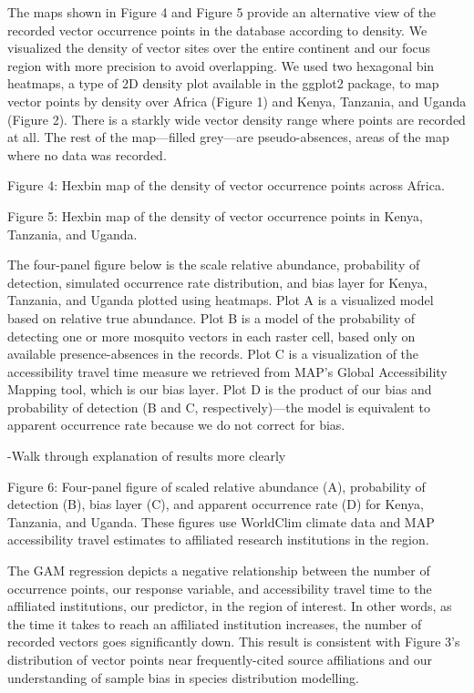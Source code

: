 \documentclass[sn-nature]{sn-jnl}%
\begin{document}
The maps shown in Figure 4 and Figure 5 provide an alternative view of the recorded vector occurrence points in the database according to density. We visualized the density of vector sites over the entire continent and our focus region with more precision to avoid overlapping. We used two hexagonal bin heatmaps, a type of 2D density plot available in the ggplot2 package, to map vector points by density over Africa (Figure 1) and Kenya, Tanzania, and Uganda (Figure 2). There is a starkly wide vector density range where points are recorded at all. The rest of the map—filled grey—are pseudo-absences, areas of the map where no data was recorded.  


Figure 4: Hexbin map of the density of vector occurrence points across Africa.


 

Figure 5: Hexbin map of the density of vector occurrence points in Kenya, Tanzania, and Uganda.

The four-panel figure below is the scale relative abundance, probability of detection, simulated occurrence rate distribution, and bias layer for Kenya, Tanzania, and Uganda plotted using heatmaps. Plot A is a visualized model based on relative true abundance. Plot B is a model of the probability of detecting one or more mosquito vectors in each raster cell, based only on available presence-absences in the records. Plot C is a visualization of the accessibility travel time measure we retrieved from MAP’s Global Accessibility Mapping tool, which is our bias layer. Plot D is the product of our bias and probability of detection (B and C, respectively)—the model is equivalent to apparent occurrence rate because we do not correct for bias. 

-Walk through explanation of results more clearly

Figure 6: Four-panel figure of scaled relative abundance (A), probability of detection (B), bias layer (C), and apparent occurrence rate (D) for Kenya, Tanzania, and Uganda. These figures use WorldClim climate data and MAP accessibility travel estimates to affiliated research institutions in the region. 

The GAM regression depicts a negative relationship between the number of occurrence points, our response variable, and accessibility travel time to the affiliated institutions, our predictor, in the region of interest. In other words, as the time it takes to reach an affiliated institution increases, the number of recorded vectors goes significantly down. This result is consistent with Figure 3’s distribution of vector points near frequently-cited source affiliations and our understanding of sample bias in species distribution modelling. 
\end{document}
